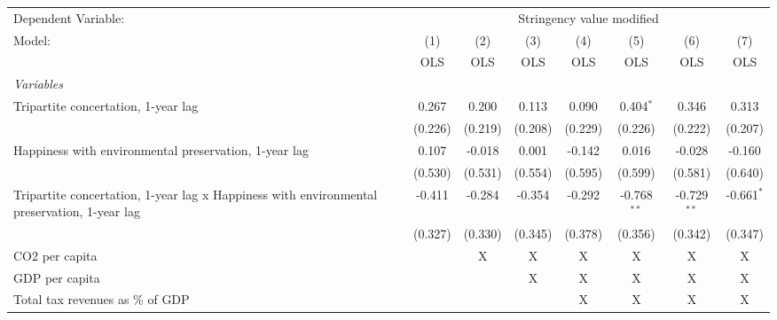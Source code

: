 
\begingroup
\centering
\begin{tabular}{lccccccc}
   \toprule
   Dependent Variable: & \multicolumn{7}{c}{Stringency value modified}\\
   Model:                                                                                      & (1)     & (2)     & (3)     & (4)     & (5)           & (6)           & (7)\\  
                                                                                               &  OLS    & OLS     & OLS     & OLS     & OLS           & OLS           & OLS\\  
   \midrule
   \emph{Variables}\\
   Tripartite concertation, 1-year lag                                                         & 0.267   & 0.200   & 0.113   & 0.090   & 0.404$^{*}$   & 0.346         & 0.313\\   
                                                                                               & (0.226) & (0.219) & (0.208) & (0.229) & (0.226)       & (0.222)       & (0.207)\\   
   Happiness with environmental preservation, 1-year lag                                       & 0.107   & -0.018  & 0.001   & -0.142  & 0.016         & -0.028        & -0.160\\   
                                                                                               & (0.530) & (0.531) & (0.554) & (0.595) & (0.599)       & (0.581)       & (0.640)\\   
   Tripartite concertation, 1-year lag x Happiness with environmental preservation, 1-year lag & -0.411  & -0.284  & -0.354  & -0.292  & -0.768$^{**}$ & -0.729$^{**}$ & -0.661$^{*}$\\   
                                                                                               & (0.327) & (0.330) & (0.345) & (0.378) & (0.356)       & (0.342)       & (0.347)\\   
   CO2 per capita                                                                              &         & X       & X       & X       & X             & X             & X\\  
   GDP per capita                                                                              &         &         & X       & X       & X             & X             & X\\  
   Total tax revenues as \% of GDP                                                             &         &         &         & X       & X             & X             & X\\  

\end{tabular}
